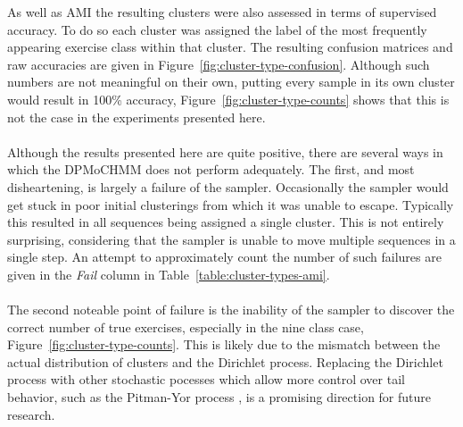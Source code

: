 \documentclass[12pt]{report}
\newcommand{\1}[0]{\mathbbm{1}}
\begin{document}
As well as \ac{AMI} the resulting clusters were also assessed in terms of
supervised accuracy. To do so each cluster was assigned the label of the most
frequently appearing exercise class within that cluster. The resulting confusion
matrices and raw accuracies are given in Figure~\ref{fig:cluster-type-confusion}.
Although such numbers are not meaningful on their own, putting every sample in its
own cluster would result in 100\% accuracy, Figure~\ref{fig:cluster-type-counts} shows that
this is not the case in the experiments presented here.
\\\\
Although the results presented here are quite positive, there are several ways in
which the \ac{DPMoCHMM} does not perform adequately. The first, and most disheartening,
is largely a failure of the sampler. Occasionally the sampler would get stuck in poor
initial clusterings from which it was unable to escape. Typically this resulted in all
sequences being assigned a single cluster. This is not entirely surprising, considering that
the sampler is unable to move multiple sequences in a single step. An attempt to approximately
count the number of such failures are given in the \emph{Fail} column in Table~\ref{table:cluster-types-ami}.
\\\\
The second noteable point of failure is the inability of the sampler to discover the correct
number of true exercises, especially in the nine class case, Figure~\ref{fig:cluster-type-counts}.
This is likely due to the mismatch between the actual distribution of clusters and the
Dirichlet process. Replacing the Dirichlet process with other stochastic pocesses which
allow more control over tail behavior, such as the Pitman-Yor process \cite{pitman-yor-teh},
is a promising direction for future research.
\end{document}
